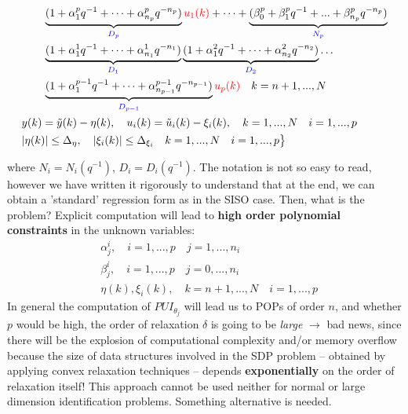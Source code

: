 \begin{equation}
\begin{aligned}
                & \qquad \underbrace{(1+\alpha_1^p{q^{-1}}+\dots+\alpha_{n_p}^p q^{-{n_p}})}_{\color{blue}D_p} {\color{red}u_1(k)}+ %
                \dots +  
                \underbrace{(\beta_0^p+ \beta_1^p q^{-1}+...+\beta_{n_p}^p q^{-{n_p}})}_{\color{blue}N_p}\\
                & \qquad \underbrace{(1+\alpha_1^1{q^{-1}}+\dots+\alpha_{n_1}^1q^{-{n_1}})}_{\color{blue}D_1} 
                \underbrace{(1+\alpha_1^2{q^{-1}}+\dots+\alpha_{n_2}^2q^{-{n_2}})}_{\color{blue}D_2} \dots\\  
                &\qquad \underbrace{(1+\alpha_1^{p-1}{q^{-1}}+\dots+
                 \alpha_{n_{p-1}}^{p-1}q^{-{n_{p-1}}})}_{\color{blue}D_{p-1}} {\color{red}u_p(k)} \quad k=n+1,...,N\\
                &y(k)=\tilde{y}(k)-\eta(k), \quad
                u_i(k)=\tilde{u}_i(k)-\xi_i(k), \quad k=1, ..., N \quad i=1,...,p\\
            &\vert \eta(k) \vert \le \Delta_\eta, \quad \vert \xi_i(k) \vert \le \Delta_{\xi_i} \quad k=1,...,N \quad i=1,...,p
            \big\}
    \end{aligned}
\end{equation}

where $N_i=N_i(q^{-1})$, $D_i=D_i(q^{-1})$. The notation is not so easy to read, however we have written it rigorously to understand that at the end, we can obtain a 'standard' regression form as in the 
SISO case. Then, what is the problem? Explicit computation will lead to \textbf{high order polynomial constraints} in the unknown variables:
\begin{equation}
    \begin{aligned}
    &\alpha_j^{i}, \quad i=1,...,p \quad j=1,...,n_i \\
    &\beta_j^{i}, \quad i=1,...,p \quad j=0,...,n_i\\
    &\eta(k), \xi_i(k), 
    \quad k=n+1,...,N \quad i=1,...,p
    \end{aligned}
\end{equation}
In general the computation of $PUI_{\theta_j}$ will lead us to POPs of order $n$, and whether $p$ would be high, the order of relaxation $\delta$ is going to be \textit{large} $\to$ bad news, since there will be the explosion of computational complexity and/or memory overflow because the size of data structures involved in the SDP problem -- obtained by applying convex relaxation techniques -- depends \textbf{exponentially} on the order of relaxation itself! This approach cannot be used neither for normal or large dimension identification problems. Something alternative is needed.

